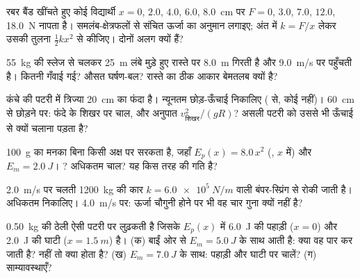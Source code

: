\begin{exercise}[$\star\star$]\label{exo:g12:work-and-energy:7}
रबर बैंड खींचते हुए कोई विद्यार्थी $x = 0$, $2.0$, $4.0$, $6.0$, \qty{8.0}{cm}
पर $F = 0$, $3.0$, $7.0$, $12.0$, \qty{18.0}{N} नापता है। समलंब-क्षेत्रफलों से
संचित ऊर्जा का अनुमान लगाइए; अंत में $k = F/x$ लेकर उसकी तुलना $\tfrac12 kx^2$
से कीजिए। दोनों अलग क्यों हैं?
\end{exercise}

\begin{exercise}[$\star\star$]\label{exo:g12:work-and-energy:8}
\qty{55}{kg} की स्लेज  से चलकर \qty{25}{m} लंबे मुड़े हुए रास्ते पर \qty{8.0}{m} गिरती
है और \qty{9.0}{m/s} पर पहुँचती है। कितनी  गँवाई गई? औसत
घर्षण-बल? रास्ते का ठीक आकार बेमतलब क्यों है?
\end{exercise}

\begin{exercise}[$\star\star$]\label{exo:g12:work-and-energy:9}
कंचे की पटरी में त्रिज्या \qty{20}{cm} का फंदा है। न्यूनतम छोड़-ऊँचाई निकालिए
( से, कोई  नहीं)। \qty{60}{cm} से छोड़ने पर: फंदे के शिखर पर चाल,
और अनुपात $v_{\text{शिखर}}^2/(gR)$? असली पटरी को उससे भी ऊँचाई से क्यों चलाना पड़ता है?
\end{exercise}

\begin{exercise}[$\star\star$]\label{exo:g12:work-and-energy:10}
\qty{100}{g} का मनका बिना  किसी अक्ष पर सरकता है, जहाँ $E_p(x) = 8.0\,x^2$
(, $x$  में) और $E_m = \qty{2.0}{J}$। ?
अधिकतम चाल? यह किस तरह की गति है?
\end{exercise}

\begin{exercise}[$\star\star$]\label{exo:g12:work-and-energy:11}
\qty{2.0}{m/s} पर चलती \qty{1200}{kg} की कार  $k = \qty{6.0e5}{N/m}$ वाली बंपर-स्प्रिंग से
रोकी जाती है। अधिकतम  निकालिए। \qty{4.0}{m/s} पर: ऊर्जा
चौगुनी होने पर भी वह चार गुना क्यों नहीं है?
\end{exercise}

\begin{exercise}[$\star\star\star$]\label{exo:g12:work-and-energy:12}
\qty{0.50}{kg} की ठेली ऐसी पटरी पर लुढ़कती है जिसके $E_p(x)$ में \qty{6.0}{J} की पहाड़ी
($x = 0$) और \qty{2.0}{J} की घाटी ($x = \qty{1.5}{m}$) है। (क) बाईं ओर से $E_m = \qty{5.0}{J}$ के साथ आती
है: क्या वह पार कर जाती है? नहीं तो क्या होता है? (ख) $E_m = \qty{7.0}{J}$ के साथ: पहाड़ी
और घाटी पर चालें? (ग) साम्यावस्थाएँ?
\end{exercise}

